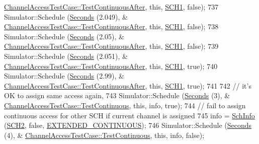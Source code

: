 \begin{DoxyCode}
      \hyperlink{classChannelAccessTestCase_ab9dcdeeb2318a3a44a4a2680ade3a6e1}{ChannelAccessTestCase::TestContinuousAfter}, \textcolor{keyword}{this}, 
      \hyperlink{channel-manager_8h_a456a1b730523e5d3b8a29fb227d10028}{SCH1}, \textcolor{keyword}{false});
737     Simulator::Schedule (\hyperlink{group__timecivil_ga33c34b816f8ff6628e33d5c8e9713b9e}{Seconds} (2.049), &
      \hyperlink{classChannelAccessTestCase_ab9dcdeeb2318a3a44a4a2680ade3a6e1}{ChannelAccessTestCase::TestContinuousAfter}, \textcolor{keyword}{this}, 
      \hyperlink{channel-manager_8h_a456a1b730523e5d3b8a29fb227d10028}{SCH1}, \textcolor{keyword}{false});
738     Simulator::Schedule (\hyperlink{group__timecivil_ga33c34b816f8ff6628e33d5c8e9713b9e}{Seconds} (2.05), &
      \hyperlink{classChannelAccessTestCase_ab9dcdeeb2318a3a44a4a2680ade3a6e1}{ChannelAccessTestCase::TestContinuousAfter}, \textcolor{keyword}{this}, 
      \hyperlink{channel-manager_8h_a456a1b730523e5d3b8a29fb227d10028}{SCH1}, \textcolor{keyword}{false});
739     Simulator::Schedule (\hyperlink{group__timecivil_ga33c34b816f8ff6628e33d5c8e9713b9e}{Seconds} (2.051), &
      \hyperlink{classChannelAccessTestCase_ab9dcdeeb2318a3a44a4a2680ade3a6e1}{ChannelAccessTestCase::TestContinuousAfter}, \textcolor{keyword}{this}, 
      \hyperlink{channel-manager_8h_a456a1b730523e5d3b8a29fb227d10028}{SCH1}, \textcolor{keyword}{true});
740     Simulator::Schedule (\hyperlink{group__timecivil_ga33c34b816f8ff6628e33d5c8e9713b9e}{Seconds} (2.99), &
      \hyperlink{classChannelAccessTestCase_ab9dcdeeb2318a3a44a4a2680ade3a6e1}{ChannelAccessTestCase::TestContinuousAfter}, \textcolor{keyword}{this}, 
      \hyperlink{channel-manager_8h_a456a1b730523e5d3b8a29fb227d10028}{SCH1}, \textcolor{keyword}{true});
741 
742     \textcolor{comment}{// it's OK to assign same access again,}
743     Simulator::Schedule (\hyperlink{group__timecivil_ga33c34b816f8ff6628e33d5c8e9713b9e}{Seconds} (3), &
      \hyperlink{classChannelAccessTestCase_ae5e346e49aa60f74439c2f2db2030d08}{ChannelAccessTestCase::TestContinuous}, \textcolor{keyword}{this}, info, \textcolor{keyword}{true});
744     \textcolor{comment}{// fail to assign continuous access for other SCH if current channel is assigned}
745     info = \hyperlink{structns3_1_1SchInfo}{SchInfo} (\hyperlink{channel-manager_8h_a07a0bff852fe2b8538a46d6e779546b6}{SCH2}, \textcolor{keyword}{false}, \hyperlink{channel-scheduler_8h_a51fe3e802b9451e2893d55d591047fc1}{EXTENDED\_CONTINUOUS});
746     Simulator::Schedule (\hyperlink{group__timecivil_ga33c34b816f8ff6628e33d5c8e9713b9e}{Seconds} (4), &
      \hyperlink{classChannelAccessTestCase_ae5e346e49aa60f74439c2f2db2030d08}{ChannelAccessTestCase::TestContinuous}, \textcolor{keyword}{this}, info, \textcolor{keyword}{false});

\end{DoxyCode}
